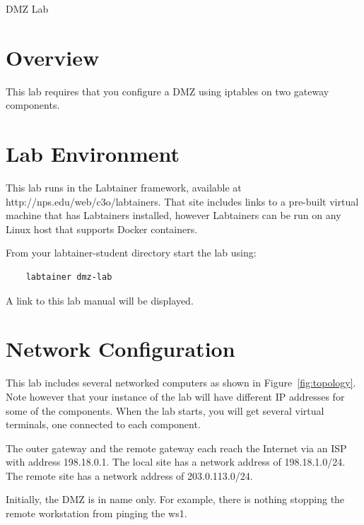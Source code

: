 


\begin{center}
{\LARGE DMZ Lab}
\vspace{0.1in}\\
\end{center}

\copyrightnotice

\section{Overview}
This lab requires that you configure a DMZ using iptables on two gateway components.

\section{Lab Environment}
This lab runs in the Labtainer framework,
available at http://nps.edu/web/c3o/labtainers.
That site includes links to a pre-built virtual machine
that has Labtainers installed, however Labtainers can
be run on any Linux host that supports Docker containers.

From your labtainer-student directory start the lab using:
\begin{verbatim}
    labtainer dmz-lab
\end{verbatim}
\noindent A link to this lab manual will be displayed.  

\section{Network Configuration}
This lab includes several networked computers as shown in Figure~\ref{fig:topology}.
Note however that your instance of the lab will have different IP addresses
for some of the components.
When the lab starts, you will get several virtual terminals, one connected to each
component.

The outer gateway and the remote gateway each reach the Internet via an ISP with 
address 198.18.0.1.  The local site has a network address of 198.18.1.0/24.  The remote
site has a network address of 203.0.113.0/24.

Initially, the DMZ is in name only.  For example, there is nothing stopping the 
remote workstation from pinging the ws1.

